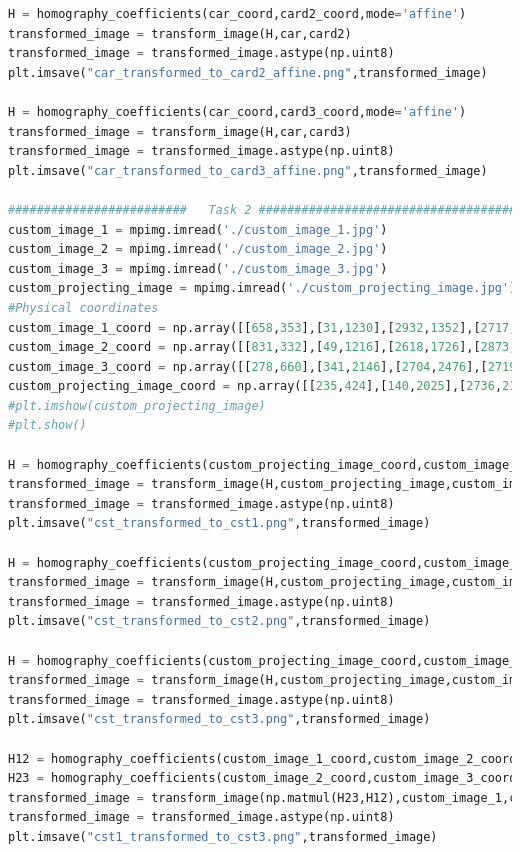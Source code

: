 \documentclass{article}
\begin{document}
\begin{lstlisting}[language=Python]
H = homography_coefficients(car_coord,card2_coord,mode='affine')
transformed_image = transform_image(H,car,card2)
transformed_image = transformed_image.astype(np.uint8)
plt.imsave("car_transformed_to_card2_affine.png",transformed_image)

H = homography_coefficients(car_coord,card3_coord,mode='affine')
transformed_image = transform_image(H,car,card3)
transformed_image = transformed_image.astype(np.uint8)
plt.imsave("car_transformed_to_card3_affine.png",transformed_image)

#########################   Task 2 #############################################
custom_image_1 = mpimg.imread('./custom_image_1.jpg')
custom_image_2 = mpimg.imread('./custom_image_2.jpg')
custom_image_3 = mpimg.imread('./custom_image_3.jpg')
custom_projecting_image = mpimg.imread('./custom_projecting_image.jpg')
#Physical coordinates
custom_image_1_coord = np.array([[658,353],[31,1230],[2932,1352],[2717,320]])
custom_image_2_coord = np.array([[831,332],[49,1216],[2618,1726],[2873,445]])
custom_image_3_coord = np.array([[278,660],[341,2146],[2704,2476],[2719,250]])
custom_projecting_image_coord = np.array([[235,424],[140,2025],[2736,2186],[2722,409]])
#plt.imshow(custom_projecting_image)
#plt.show()

H = homography_coefficients(custom_projecting_image_coord,custom_image_1_coord)
transformed_image = transform_image(H,custom_projecting_image,custom_image_1)
transformed_image = transformed_image.astype(np.uint8)
plt.imsave("cst_transformed_to_cst1.png",transformed_image)

H = homography_coefficients(custom_projecting_image_coord,custom_image_2_coord)
transformed_image = transform_image(H,custom_projecting_image,custom_image_2)
transformed_image = transformed_image.astype(np.uint8)
plt.imsave("cst_transformed_to_cst2.png",transformed_image)

H = homography_coefficients(custom_projecting_image_coord,custom_image_3_coord)
transformed_image = transform_image(H,custom_projecting_image,custom_image_3)
transformed_image = transformed_image.astype(np.uint8)
plt.imsave("cst_transformed_to_cst3.png",transformed_image)

H12 = homography_coefficients(custom_image_1_coord,custom_image_2_coord)
H23 = homography_coefficients(custom_image_2_coord,custom_image_3_coord)
transformed_image = transform_image(np.matmul(H23,H12),custom_image_1,custom_image_3)
transformed_image = transformed_image.astype(np.uint8)
plt.imsave("cst1_transformed_to_cst3.png",transformed_image)


\end{lstlisting}
\end{document}
